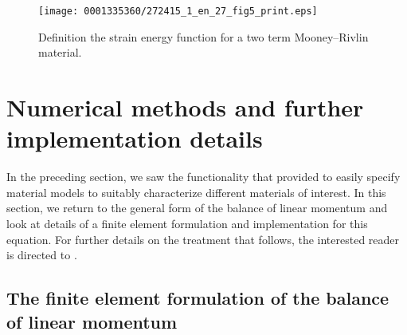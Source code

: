 \begin{figure}[!t]
\texttt{[image: 0001335360/272415\_1\_en\_27\_fig5\_print.eps]}
\caption{Definition the strain energy function for a two term
  Mooney--Rivlin material.}
\label{code:narayanan:mr}
\end{figure}

\section{Numerical methods and further implementation details}

In the preceding section, we saw the functionality that \twist{}
provided to easily specify material models to suitably characterize
different materials of interest. In this section, we return to the
general form of the balance of linear momentum and look at details of
a finite element formulation and implementation for this equation. For
further details on the treatment that follows, the interested reader
is directed to \citet{SimoHughes1998}.

\subsection{The finite element formulation of the balance of linear
  momentum}

